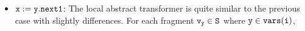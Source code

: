 \begin{itemize}
	
\item ${\tt x := y.next1}$: The local abstract transformer is quite similar to the previous case with slightly differences. For each fragment $\tt \mathtt{v}_y \in S$ where $\tt y \in {\tt vars}(\tt i)$,
%
%
%
%
%
%
%

\end{itemize}
